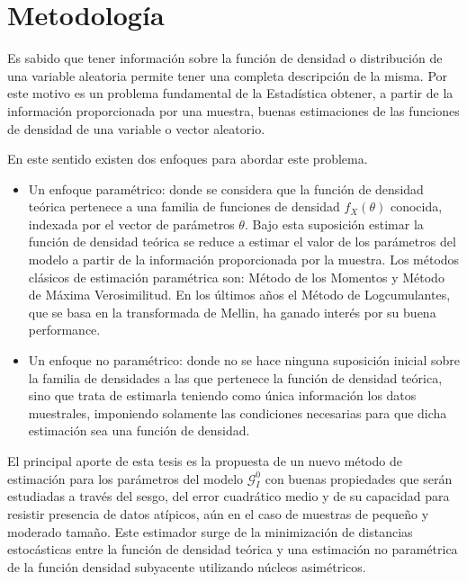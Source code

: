 
\chapter{Metodología}
\label{metodologia}

Es sabido que tener información sobre la función de densidad o distribución de una variable aleatoria permite tener una completa descripción de la misma. Por este motivo es un problema fundamental de la Estadística obtener, a partir de la información proporcionada por una muestra,  buenas estimaciones de las funciones de densidad de una variable o vector aleatorio. 

En este sentido existen dos enfoques para abordar este problema. 

\begin{itemize}
	\item Un enfoque paramétrico: donde se considera que la función de densidad teórica pertenece a una familia de funciones de densidad $f_X(\theta)$ conocida, indexada por el vector de parámetros $\theta$. Bajo esta suposición estimar la función de densidad teórica se reduce a estimar el valor de los parámetros del modelo a partir de la información proporcionada por la muestra. Los métodos clásicos de estimación paramétrica son: Método de los Momentos y Método de Máxima Verosimilitud. En los últimos años el Método de Logcumulantes, que se basa en la transformada de Mellin, ha ganado interés por su buena performance.
	\item Un enfoque no paramétrico: donde no se hace ninguna suposición inicial sobre la familia de densidades a las que pertenece la función de densidad teórica, sino que trata de estimarla teniendo como única información los datos muestrales, imponiendo  solamente las condiciones necesarias para que dicha estimación sea una función de densidad.
\end{itemize}

El principal aporte de esta tesis es la propuesta de un nuevo método de estimación para los parámetros del modelo $\mathcal G_I^0$ con buenas propiedades que serán estudiadas a través del sesgo, del error cuadrático medio y de su capacidad para resistir presencia de datos atípicos, aún en el caso de muestras de pequeño y moderado tamaño. Este estimador surge de la minimización de distancias estocásticas entre la función de densidad teórica y una estimación no paramétrica de la función densidad subyacente utilizando núcleos asimétricos. 

